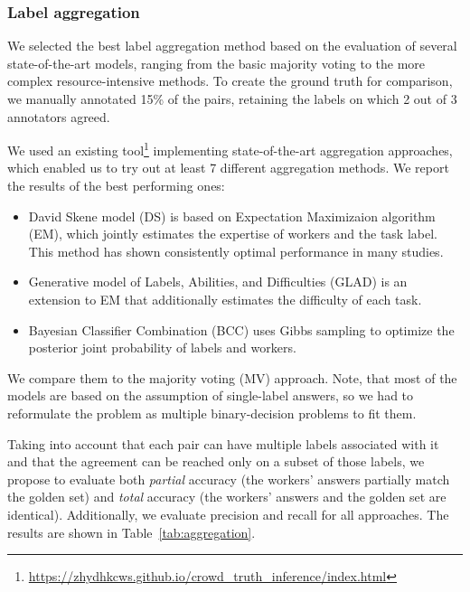 \subsubsection{Label aggregation}
\label{label_aggregation}
We selected the best label aggregation method based on the evaluation of several state-of-the-art models, ranging from the basic majority voting to the more complex resource-intensive methods.
To create the ground truth for comparison, 
we manually annotated 15\% of the pairs, retaining the labels on which 2 out of 3 annotators agreed.

We used an existing tool\footnote{\url{https://zhydhkcws.github.io/crowd_truth_inference/index.html}} implementing state-of-the-art aggregation approaches, which enabled us to try out at least 7 different aggregation methods. We report the results of the best performing ones: 
\begin{itemize}
    \item David Skene model (DS) \cite{dawid1979maximum} is based on Expectation Maximizaion algorithm (EM), which jointly estimates the expertise of workers and the task label. This method has shown consistently optimal performance in many studies.
    \item Generative model of Labels, Abilities, and Difficulties (GLAD) \cite{whitehill2009whose} is an extension to EM that additionally estimates the difficulty of each task.
    \item Bayesian Classifier Combination (BCC) \cite{kim2012bayesian} uses Gibbs sampling to optimize the posterior joint probability of labels and workers.
\end{itemize}
We compare them to the majority voting (MV) approach. Note, that most of the models are based on the assumption of single-label answers, so we had to reformulate the problem as multiple binary-decision problems to fit them.

Taking into account that each pair can have multiple labels associated with it and that the agreement can be reached only on a subset of those labels, we propose to evaluate both \emph{partial} accuracy (the workers' answers partially match the golden set) and \emph{total} accuracy (the workers' answers and the golden set are identical). Additionally, we evaluate precision and recall for all approaches. The results are shown in Table~\ref{tab:aggregation}. 

